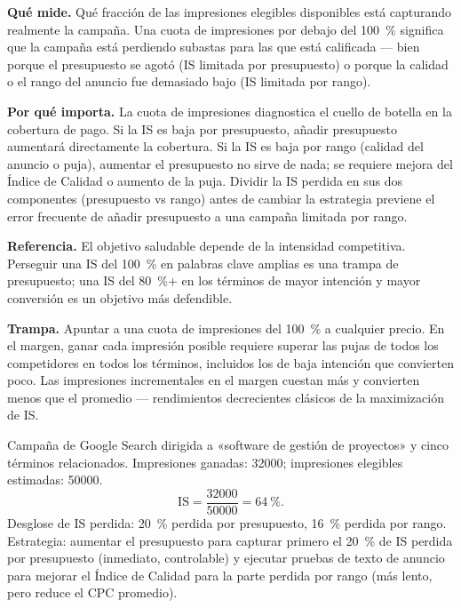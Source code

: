 \textbf{Qué mide.} Qué fracción de las impresiones elegibles disponibles está capturando
realmente la campaña. Una cuota de impresiones por debajo del \qty{100}{\percent} significa
que la campaña está perdiendo subastas para las que está calificada --- bien porque el
presupuesto se agotó (IS limitada por presupuesto) o porque la calidad o el rango del anuncio
fue demasiado bajo (IS limitada por rango).

\textbf{Por qué importa.} La cuota de impresiones diagnostica el cuello de botella en la
cobertura de pago. Si la IS es baja por presupuesto, añadir presupuesto aumentará directamente
la cobertura. Si la IS es baja por rango (calidad del anuncio o puja), aumentar el presupuesto
no sirve de nada; se requiere mejora del Índice de Calidad o aumento de la puja. Dividir la
IS perdida en sus dos componentes (presupuesto vs rango) antes de cambiar la estrategia
previene el error frecuente de añadir presupuesto a una campaña limitada por rango.

\textbf{Referencia.} El objetivo saludable depende de la intensidad competitiva. Perseguir
una IS del \qty{100}{\percent} en palabras clave amplias es una trampa de presupuesto;
una IS del \qty{80}{\percent}+ en los términos de mayor intención y mayor conversión es un
objetivo más defendible.

\textbf{Trampa.} Apuntar a una cuota de impresiones del \qty{100}{\percent} a cualquier
precio. En el margen, ganar cada impresión posible requiere superar las pujas de todos los
competidores en todos los términos, incluidos los de baja intención que convierten poco. Las
impresiones incrementales en el margen cuestan más y convierten menos que el promedio ---
rendimientos decrecientes clásicos de la maximización de IS.

\begin{example}
Campaña de Google Search dirigida a «software de gestión de proyectos» y cinco términos
relacionados. Impresiones ganadas: \num{32000}; impresiones elegibles estimadas: \num{50000}.
\[
  \text{IS} = \frac{32000}{50000} = \qty{64}{\percent}.
\]
Desglose de IS perdida: \qty{20}{\percent} perdida por presupuesto, \qty{16}{\percent}
perdida por rango. Estrategia: aumentar el presupuesto para capturar primero el \qty{20}{\percent}
de IS perdida por presupuesto (inmediato, controlable) y ejecutar pruebas de texto de anuncio
para mejorar el Índice de Calidad para la parte perdida por rango (más lento, pero reduce el
CPC promedio).
\end{example}


